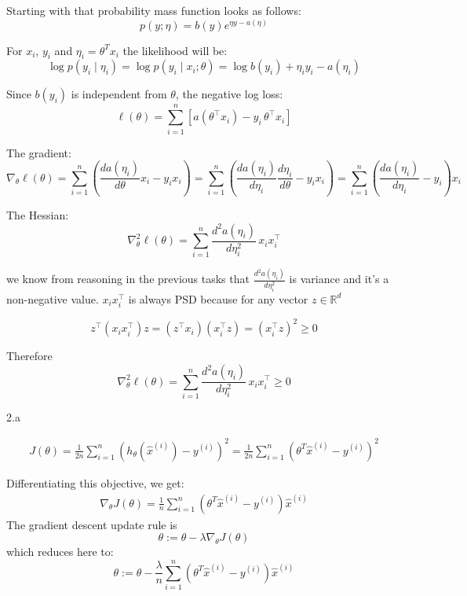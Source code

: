 \begin{answer}
  Starting with that probability mass function looks as follows:
  \[
  p(y;\eta) = b(y)e^{\eta y - a(\eta)}
  \]

  For $x_i$, $y_i$ and $\eta_i=\theta^Tx_i$ the likelihood will be: \[
\log p(y_i \mid \eta_i) = \log p(y_i \mid x_i; \theta) = \log b(y_i) + \eta_i y_i - a(\eta_i)
\]

Since $b(y_i)$ is independent from $\theta$, the negative log loss:
\[
\ell(\theta) = \sum_{i=1}^{n} \left[ a(\theta^\top x_i) - y_i \, \theta^\top x_i \right]
\]

The gradient:
\[
\nabla_\theta \ell(\theta) = \sum_{i=1}^{n} \left( \frac{da(\eta_i)}{d \theta} x_i - y_i x_i \right)
= \sum_{i=1}^{n} \left( \frac{da(\eta_i)}{d\eta_i}\frac{d\eta_i}{d\theta} - y_i x_i \right) = \sum_{i=1}^{n} \left( \frac{d a(\eta_i)}{d \eta_i} - y_i \right) x_i
\]

The Hessian:
\[
\nabla^2_\theta \ell(\theta) = \sum_{i=1}^{n} \frac{d^2 a(\eta_i)}{d \eta_i^2} \, x_i x_i^\top
\]

we know from reasoning in the previous tasks that $\frac{d^2 a(\eta_i)}{d\eta_i^2}$ is variance and it's a non-negative value. $x_i x_i^\top$ is always PSD because for any vector $z \in \mathbb{R}^d$

\[
z^\top (x_i x_i^\top) z = (z^\top x_i)(x_i^\top z) = (x_i^\top z)^2 \geq 0
\]

Therefore 
\[
\nabla^2_\theta \ell(\theta) = \sum_{i=1}^{n} \frac{d^2 a(\eta_i)}{d \eta_i^2} \, x_i x_i^\top \geq 0
\]
\end{answer}
\clearpage

\LARGE
2.a
\normalsize

\begin{answer}
  
  \begin{align*}
      J(\theta) = \frac{1}{2n} \sum_{i=1}^{n} \left( h_\theta (\hat{x}^{(i)}) - y^{(i)} \right)^2 = \frac{1}{2n} \sum_{i=1}^{n} \left( \theta^T \hat{x}^{(i)} - y^{(i)} \right)^2
  \end{align*}

  Differentiating this objective, we get:
  \begin{align*}
      \nabla_{\theta} J(\theta) = \frac{1}{n} \sum_{i=1}^{n} \left( \theta^T \hat{x}^{(i)} - y^{(i)} \right) \hat{x}^{(i)}
  \end{align*}
  The gradient descent update rule is
  \begin{equation*}
  \theta := \theta - \lambda \nabla_{\theta} J(\theta)
  \end{equation*}
  which reduces here to:
  \[
  \theta := \theta - \frac{\lambda}{n} \sum_{i=1}^{n} \left( \theta^T \hat{x}^{(i)} - y^{(i)} \right) \hat{x}^{(i)}
  \]
\end{answer}
\clearpage

